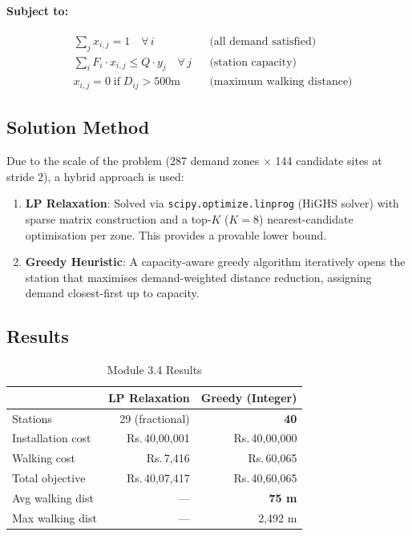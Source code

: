 \documentclass[11pt,a4paper]{article}
\begin{document}
\paragraph{Subject to:}
\begin{align}
    &\sum_j x_{i,j} = 1 \quad \forall\, i &&\text{(all demand satisfied)} \\
    &\sum_i F_i \cdot x_{i,j} \le Q \cdot y_j \quad \forall\, j &&\text{(station capacity)} \\
    &x_{i,j} = 0 \;\text{if}\; D_{ij} > 500\text{m} &&\text{(maximum walking distance)}
\end{align}

\subsection{Solution Method}

Due to the scale of the problem (287 demand zones $\times$ 144 candidate sites at stride 2), a hybrid approach is used:
\begin{enumerate}
    \item \textbf{LP Relaxation}: Solved via \texttt{scipy.optimize.linprog} (HiGHS solver) with sparse matrix construction and a top-$K$ ($K=8$) nearest-candidate optimisation per zone. This provides a provable lower bound.
    \item \textbf{Greedy Heuristic}: A capacity-aware greedy algorithm iteratively opens the station that maximises demand-weighted distance reduction, assigning demand closest-first up to capacity.
\end{enumerate}

\subsection{Results}

\begin{table}[H]
\centering
\caption{Module 3.4 Results}
\begin{tabular}{lrr}
\toprule
& \textbf{LP Relaxation} & \textbf{Greedy (Integer)} \\ \midrule
Stations          & 29 (fractional) & \textbf{40} \\
Installation cost & Rs.\,40,00,001  & Rs.\,40,00,000 \\
Walking cost      & Rs.\,7,416      & Rs.\,60,065 \\
Total objective   & Rs.\,40,07,417  & Rs.\,40,60,065 \\
Avg walking dist  & ---             & \textbf{75 m} \\
Max walking dist  & ---             & 2,492 m \\
\bottomrule
\end{tabular}
\end{table}
\end{document}
